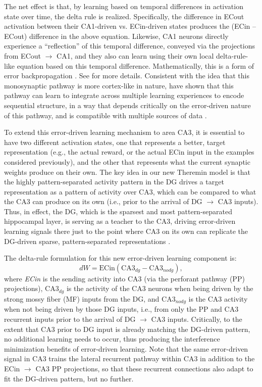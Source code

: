 \documentclass[11pt,twoside]{article}
\newif\myifpdf
\begin{document}
The net effect is that, by learning based on temporal differences in activation state over time, the delta rule is realized.  Specifically, the difference in ECout activation between their CA1-driven vs. ECin-driven states produces the (ECin -- ECout) difference in the above equation.  Likewise, CA1 neurons directly experience a ``reflection'' of this temporal difference, conveyed via the projections from ECout $\rightarrow$ CA1, and they also can learn using their own local delta-rule-like equation based on this temporal difference.  Mathematically, this is a form of error backpropagation \citep{OReilly96,WhittingtonBogacz19,LillicrapSantoroMarrisEtAl20}.  See \citet{KetzMorkondaOReilly13} for more details.  Consistent with the idea that this monosynaptic pathway is more cortex-like in nature, \citet{SchapiroTurk-BrowneBotvinickEtAl17} have shown that this pathway can learn to integrate across multiple learning experiences to encode sequential structure, in a way that depends critically on the error-driven nature of this pathway, and is compatible with multiple sources of data \citep{SchapiroTurk-BrowneNormanEtAl16}.

To extend this error-driven learning mechanism to area CA3, it is essential to have two different activation states, one that represents a better, target representation (e.g., the actual reward, or the actual ECin input in the examples considered previously), and the other that represents what the current synaptic weights produce on their own.  The key idea in our new Theremin model is that the highly pattern-separated activity pattern in the DG drives a target representation as a pattern of activity over CA3, which can be compared to what the CA3 can produce on its own (i.e., prior to the arrival of DG $\rightarrow$ CA3 inputs).  Thus, in effect, the DG, which is the sparsest and most pattern-separated hippocampal layer, is serving as a teacher to the CA3, driving error-driven learning signals there just to the point where CA3 on its own can replicate the DG-driven sparse, pattern-separated representations \citep{KowadloAhmedRawlinson20}.

The delta-rule formulation for this new error-driven learning component is:
\begin{equation}
dW = \mbox{ECin} (\mbox{CA3}_{dg} - \mbox{CA3}_{nodg}),
\end{equation}
where \emph{ECin} is the sending activity into CA3 (via the perforant pathway (PP) projections), $\mbox{CA3}_{dg}$ is the activity of the CA3 neurons when being driven by the strong mossy fiber (MF) inputs from the DG, and $\mbox{CA3}_{nodg}$ is the CA3 activity when not being driven by those DG inputs, i.e., from only the PP and CA3 recurrent inputs prior to the arrival of DG $\rightarrow$ CA3 inputs.  Critically, to the extent that CA3 prior to DG input is already matching the DG-driven pattern, no additional learning needs to occur, thus producing the interference minimization benefits of error-driven learning.  Note that the same error-driven signal in CA3 trains the lateral recurrent pathway within CA3 in addition to the ECin $\rightarrow$ CA3 PP projections, so that these recurrent connections also adapt to fit the DG-driven pattern, but no further.
\end{document}
